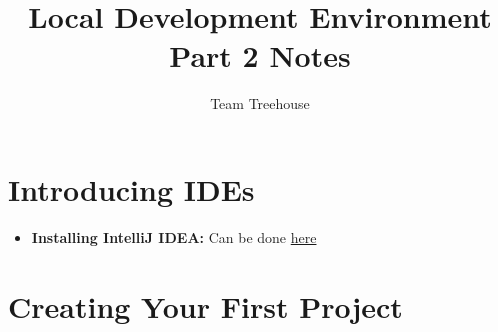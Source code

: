 \documentclass[12pt]{article}
\begin{document}
\title{Local Development Environment Part 2 Notes}
\author{Team Treehouse}
\maketitle

\section{Introducing IDEs}

\bigskip

\begin{itemize}
    \item \textbf{Installing IntelliJ IDEA:} Can be done \href{http://treehouse.github.io/installation-guides/mac/intellij-idea-mac.html}{here}
\end{itemize}

\bigskip

\section{Creating Your First Project}

\bigskip
\end{document}
